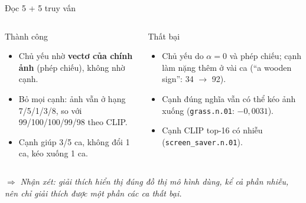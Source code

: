 \documentclass[10pt, aspectratio=169]{beamer}
\newcommand{\nhanxet}[1]{\par\smallskip$\Rightarrow$ \textit{Nhận xét: #1}}
\newcommand{\code}[1]{\texttt{#1}}
\begin{document}
\begin{frame}{Đọc 5 + 5 truy vấn}
  \begin{columns}[T]
      \begin{block}{Thành công}
        \begin{itemize}
          \item Chủ yếu nhờ \textbf{vectơ của chính ảnh} (phép chiếu), không nhờ cạnh.
          \item Bỏ mọi cạnh: ảnh vẫn ở hạng 7/5/1/3/8, so với 99/100/100/99/98 theo CLIP.
          \item Cạnh giúp 3/5 ca, không đổi 1 ca, kéo xuống 1 ca.
        \end{itemize}
      \end{block}
      \begin{alertblock}{Thất bại}
        \begin{itemize}
          \item Chủ yếu do $\alpha = 0$ và phép chiếu; cạnh làm nặng thêm ở vài ca (``a wooden sign'': 34 $\to$ 92).
          \item Cạnh đúng nghĩa vẫn có thể kéo ảnh xuống (\code{grass.n.01}: $-0{,}0031$).
          \item Cạnh CLIP top-16 có nhiễu (\code{screen\_saver.n.01}).
        \end{itemize}
      \end{alertblock}
  \end{columns}
  \nhanxet{giải thích hiển thị đúng đồ thị mô hình dùng, kể cả phần nhiễu, nên chỉ giải thích được một phần các ca thất bại.}
\end{frame}
\end{document}
